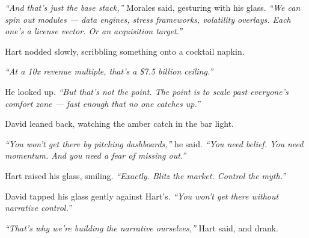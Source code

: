 \medskip

\textit{``And that’s just the base stack,''} Morales said, gesturing with his glass.  
\textit{``We can spin out modules — data engines, stress frameworks, volatility overlays.  
Each one’s a license vector. Or an acquisition target.''}

Hart nodded slowly, scribbling something onto a cocktail napkin.

\textit{``At a 10x revenue multiple, that’s a \$7.5 billion ceiling.''}

He looked up. \textit{``But that’s not the point.  
The point is to scale past everyone’s comfort zone — fast enough that no one catches up.''}

David leaned back, watching the amber catch in the bar light.

\textit{``You won’t get there by pitching dashboards,''} he said.  
\textit{``You need belief. You need momentum. And you need a fear of missing out.''}

Hart raised his glass, smiling. \textit{``Exactly. Blitz the market. Control the myth.''}

David tapped his glass gently against Hart’s. \textit{``You won’t get there without narrative control.''}

\textit{``That’s why we’re building the narrative ourselves,''} Hart said, and drank.


\medskip

